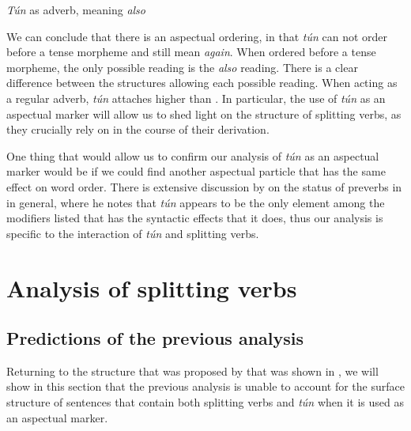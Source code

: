 \documentclass[output=paper,newtxmath,modfonts,nonflat,draftmode]{langsci/langscibook}
\begin{document}
\z



\ea \textit{Tún} as adverb, meaning \textit{also}
    
 \z
 \label{ex:parrish:ma-also} 
\z


We can conclude that there is an aspectual ordering, in that \textit{tún} can not order before a tense morpheme and still mean \textit{again}. When ordered before a tense morpheme, the only possible reading is the \textit{also} reading. There is a clear difference between the structures allowing each possible reading. When acting as a regular adverb, \textit{tún} attaches higher than . In particular, the use of \textit{tún} as an aspectual marker will allow us to shed light on the structure of splitting verbs, as they crucially rely on  in the course of their derivation.

One thing that would allow us to confirm our analysis of \textit{tún} as an aspectual marker would be if we could find another aspectual particle that has the same effect on word order. There is extensive discussion by \citet{Awoyale1974} on the status of preverbs in  in general, where he notes that \textit{tún} appears to be the only element among the modifiers listed that has the syntactic effects that it does, thus our analysis is specific to the interaction of \textit{tún} and splitting verbs.

\section{Analysis of splitting verbs}
\label{sect:parrish:analysis}
\largerpage
\subsection{Predictions of the previous analysis}

Returning to the structure that was proposed by \citet{Bode2007} that was shown in , we will show in this section that the previous analysis is unable to account for the surface structure of sentences that contain both splitting verbs and \textit{tún} when it is used as an aspectual marker.
\end{document}
